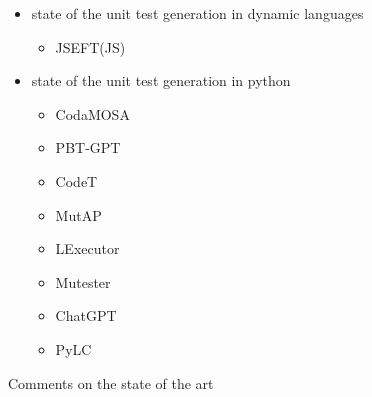 \documentclass[%
  chapterprefix=false,%
  open=right,%
  twoside=true,%
  paper=a4,%
  logofile={Figures/logo.png},%
  thesistype=master,%
  UKenglish,%
]{se2thesis}
\begin{document}
\begin{itemize}
  \item state of the unit test generation in dynamic languages
  \begin{itemize}
    \item JSEFT(JS)~\cite{DBLP:conf/icst/Mirshokraie0P15}
  \end{itemize}
  \item state of the unit test generation in python
  \begin{itemize}
    \item CodaMOSA~\cite{DBLP:conf/icse/LemieuxILS23}
    \item PBT-GPT~\cite{DBLP:journals/corr/abs-2307-04346}
    \item CodeT~\cite{DBLP:journals/corr/abs-2207-10397}
    \item MutAP~\cite{DBLP:journals/corr/abs-2308-16557}
    \item LExecutor~\cite{DBLP:journals/corr/abs-2302-02343}
    \item Mutester~\cite{DBLP:journals/corr/abs-2307-00404}
    \item ChatGPT~\cite{li2023nuances}
    \item PyLC~\cite{DBLP:conf/sac/SalariEAS23}
  \end{itemize}
\end{itemize}

Comments on the state of the art

\backmatter{}

\printbibliography{}
\end{document}
